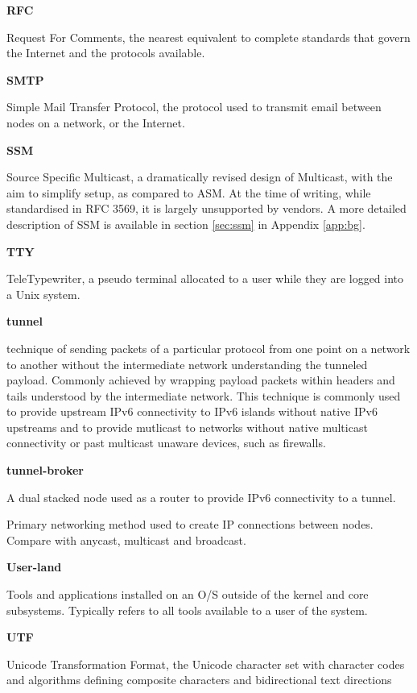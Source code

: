\textbf{RFC}

Request For Comments, the nearest equivalent to complete standards that
govern the Internet and the protocols available.

\textbf{SMTP}

Simple Mail Transfer Protocol, the protocol used to transmit email
between nodes on a network, or the Internet.

\textbf{SSM}

Source Specific Multicast, a dramatically revised design of Multicast,
with the aim to simplify setup, as compared to ASM. At the time of
writing, while standardised in RFC 3569, it is largely unsupported by
vendors. A more detailed description of SSM is available in section 
\ref{sec:ssm} in Appendix \ref{app:bg}.

\textbf{TTY}

TeleTypewriter, a pseudo terminal allocated to a user while they are
logged into a Unix system.

\textbf{tunnel}

technique of sending packets of a particular protocol from one point on
a network to another without the intermediate network understanding the
tunneled payload. Commonly achieved by wrapping payload packets within
headers and tails understood by the intermediate network. This
technique is commonly used to provide upstream IPv6 connectivity to IPv6
islands without native IPv6 upstreams and to provide mutlicast
to networks without native multicast connectivity or past multicast
unaware devices, such as firewalls.

\textbf{tunnel-broker}

A dual stacked node used as a router to provide IPv6 connectivity to a
tunnel.


Primary networking method used to create IP connections between nodes.
Compare with anycast, multicast and broadcast.

\textbf{User-land}

Tools and applications installed on an O/S outside of the kernel and
core subsystems. Typically refers to all tools available to a user of
the system.


\textbf{UTF}

Unicode Transformation Format, the Unicode character set with character 
codes and algorithms defining composite characters and bidirectional
text directions

